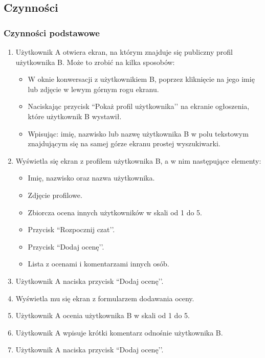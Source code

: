 \documentclass[12pt,a4paper,twoside]{article}
\begin{document}
    \subsection{Czynności}
    
    
    \subsubsection{Czynności podstawowe}
    
    
    \begin{enumerate}
        \item Użytkownik A otwiera ekran, na którym znajduje się publiczny profil użytkownika B. Może to zrobić na kilka sposobów:
        \begin{itemize}
            \item W oknie konwersacji z użytkownikiem B, poprzez kliknięcie na jego imię lub zdjęcie w lewym górnym rogu ekranu.
            \item Naciskając przycisk ``Pokaż profil użytkownika’’ na ekranie ogłoszenia, które użytkownik B wystawił.
            \item Wpisując: imię, nazwisko lub nazwę użytkownika B w polu tekstowym znajdującym się na samej górze ekranu prostej wyszukiwarki.
        \end{itemize}
        \item Wyświetla się ekran z profilem użytkownika B, a w nim następujące elementy:
        \begin{itemize}
            \item Imię, nazwisko oraz nazwa użytkownika.
            \item Zdjęcie profilowe.
            \item Zbiorcza ocena innych użytkowników w skali od 1 do 5.
            \item Przycisk ``Rozpocznij czat’’.
            \item Przycisk ``Dodaj ocenę’’.
            \item Lista z ocenami i komentarzami innych osób.
        \end{itemize}
        \item Użytkownik A naciska przycisk ``Dodaj ocenę’’.
        \item Wyświetla mu się ekran z formularzem dodawania oceny.
        \item Użytkownik A ocenia użytkownika B w skali od 1 do 5.
        \item Użytkownik A wpisuje krótki komentarz odnośnie użytkownika B.
        \item Użytkownik A naciska przycisk ``Dodaj ocenę’’.
    \end{enumerate}
    
\end{document}
